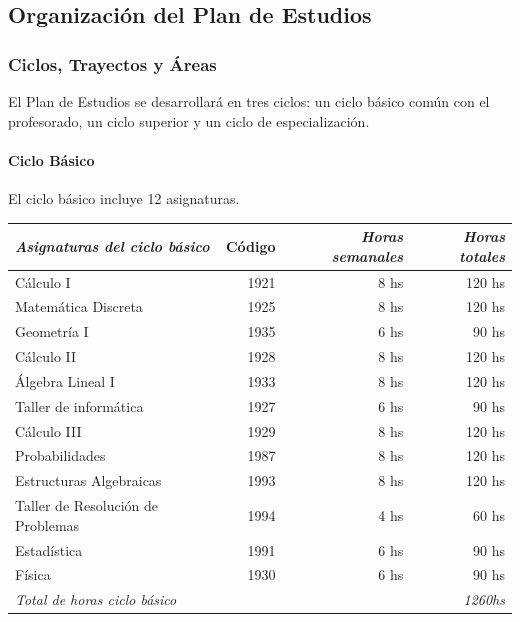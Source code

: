 \documentclass[a4paper, 12pt]{article}
\newenvironment{colortext}[1]{\color{#1}}{\ignorespacesafterend}
\begin{document}
\subsection{Organización del Plan de Estudios}
\begin{colortext}{blue}
\subsubsection{Ciclos, Trayectos  y Áreas} El Plan de Estudios se desarrollará en tres ciclos:
un ciclo básico común con el profesorado, un ciclo superior y un
ciclo de especialización.

\paragraph{Ciclo Básico} El ciclo básico incluye 12 asignaturas.

\setlength\arrayrulewidth{1pt}
\begin{center}
\begin{tabular}{|l|r|r|r|}\hline
  \rowcolor[gray]{.9}
  \emph{Asignaturas del ciclo básico} & Código  & \emph{Horas semanales} &  \emph{Horas totales}
  \\\hline
  Cálculo I                          &   1921   &           8 hs  &   120 hs         \\ \hline
  Matemática Discreta       	     &   1925   &           8 hs  &   120 hs         \\ \hline
  Geometría I               	     &   1935   &           6 hs  &    90 hs         \\ \hline
  Cálculo II                         &   1928   &           8 hs  &   120 hs         \\ \hline
  Álgebra Lineal I                   &   1933   &           8 hs  &   120 hs         \\ \hline
  Taller de informática              &   1927   &           6 hs  &    90 hs         \\ \hline
  Cálculo III                        &   1929   &           8 hs  &   120 hs         \\ \hline
  Probabilidades                     &   1987   &           8 hs  &   120 hs         \\ \hline
  Estructuras Algebraicas            &   1993   &           8 hs  &   120 hs         \\ \hline
  Taller de Resolución de Problemas  &   1994   &           4 hs  &    60 hs         \\ \hline
  Estadística                        &   1991   &           6 hs  &    90 hs         \\ \hline
  Física                             &   1930   &           6 hs  &    90 hs         \\ \hline
  \emph{Total de horas ciclo básico }& \multicolumn{3}{r|}{\emph{1260hs}}            \\ \hline
\end{tabular}
\end{center}



\end{colortext}
\end{document}
